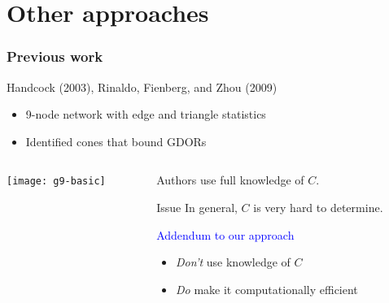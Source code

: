 \documentclass[ 10pt]{beamer}
\newcommand{\yobs}{y_{\text{obs}}}
\begin{document}
\section{Other approaches}
\frame
{
  \frametitle{Previous work}  
Handcock (2003), Rinaldo, Fienberg, and Zhou (2009)
\begin{itemize}
	\item 9-node network with edge and triangle statistics
	\item Identified cones that bound GDORs %
\end{itemize}

\begin{columns}[]
\begin{column}[T]{0.4\textwidth}
\texttt{[image: g9-basic]}
\end{column}

\begin{column}[t]{0.60\textwidth}
\vspace{1mm}

Authors use full knowledge of $C$.  

\vspace{2mm}

\pause
\begin{alertblock}{Issue}
In general, $C$ is very hard to determine.
\vspace{2mm}

\textcolor{blue}{Addendum to our approach}
\begin{itemize}
\item \emph{Don't} use knowledge of $C$
\item \emph{Do} make it computationally efficient
\vspace{2mm}
\end{itemize}
\vspace{2mm}
\end{alertblock}
\end{column}
\end{columns}


}
\end{document}
